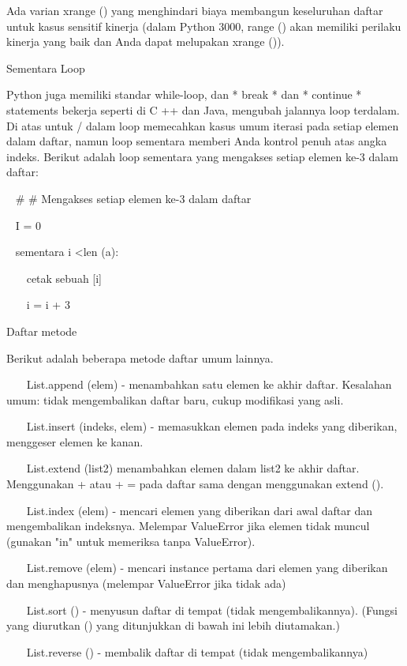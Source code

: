 Ada varian xrange () yang menghindari biaya membangun keseluruhan daftar untuk kasus sensitif kinerja (dalam Python 3000, range () akan memiliki perilaku kinerja yang baik dan Anda dapat melupakan xrange ()). \par
Sementara Loop \par
\vspace{12pt}
Python juga memiliki standar while-loop, dan * break * dan * continue * statements bekerja seperti di C ++ dan Java, mengubah jalannya loop terdalam. Di atas untuk / dalam loop memecahkan kasus umum iterasi pada setiap elemen dalam daftar, namun loop sementara memberi Anda kontrol penuh atas angka indeks. Berikut adalah loop sementara yang mengakses setiap elemen ke-3 dalam daftar: \par
\vspace{12pt}
~    \#     \#   Mengakses setiap elemen ke-3 dalam daftar \par
~ I = 0 \par
~ sementara i <len (a): \par
~~~ cetak sebuah [i] \par
~~~ i = i + 3 \par
Daftar metode \par
\vspace{12pt}
Berikut adalah beberapa metode daftar umum lainnya. \par
\vspace{12pt}
~~~ List.append (elem) - menambahkan satu elemen ke akhir daftar. Kesalahan umum: tidak mengembalikan daftar baru, cukup modifikasi yang asli. \par
~~~ List.insert (indeks, elem) - memasukkan elemen pada indeks yang diberikan, menggeser elemen ke kanan. \par
~~~ List.extend (list2) menambahkan elemen dalam list2 ke akhir daftar. Menggunakan + atau + = pada daftar sama dengan menggunakan extend (). \par
~~~ List.index (elem) - mencari elemen yang diberikan dari awal daftar dan mengembalikan indeksnya. Melempar ValueError jika elemen tidak muncul (gunakan "in" untuk memeriksa tanpa ValueError). \par
~~~ List.remove (elem) - mencari instance pertama dari elemen yang diberikan dan menghapusnya (melempar ValueError jika tidak ada) \par
~~~ List.sort () - menyusun daftar di tempat (tidak mengembalikannya). (Fungsi yang diurutkan () yang ditunjukkan di bawah ini lebih diutamakan.) \par
~~~ List.reverse () - membalik daftar di tempat (tidak mengembalikannya) \par
